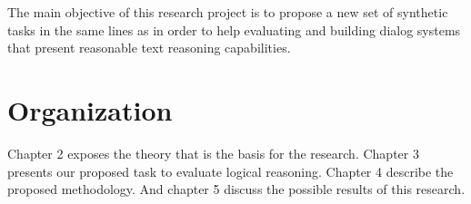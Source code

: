 The main objective of this research project is to propose a new set of synthetic tasks in the same lines as \cite{WestonBCM15} in order to help evaluating and building dialog systems that present reasonable text reasoning capabilities.


\section{Organization}
\label{sec:organization}

Chapter 2 exposes the theory that is the basis for the research. Chapter 3 presents our proposed task to evaluate logical reasoning. Chapter 4 describe the proposed methodology. And chapter 5 discuss the possible results of this research.



